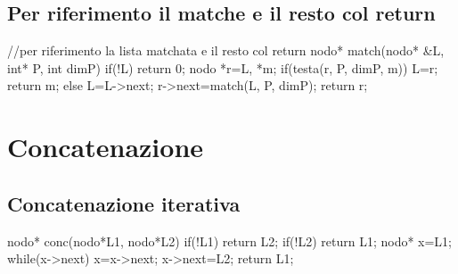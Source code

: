\subsection{Per riferimento il matche e il resto col return}
\begin{codice}

//per riferimento la lista matchata e il resto col return
nodo* match(nodo* &L, int* P, int dimP) {
if(!L) return 0;
nodo *r=L, *m;
if(testa(r, P, dimP, m)) {
    L=r;
    return m;
}
else {
    L=L->next;
    r->next=match(L, P, dimP);
    return r;
}
}
\end{codice}

\section{Concatenazione}
\subsection{Concatenazione iterativa}
\begin{codice}
nodo* conc(nodo*L1, nodo*L2){
    if(!L1) return L2;
    if(!L2) return L1;
    nodo* x=L1;
    while(x->next)
        x=x->next;
    x->next=L2;
    return L1;
}
\end{codice}

